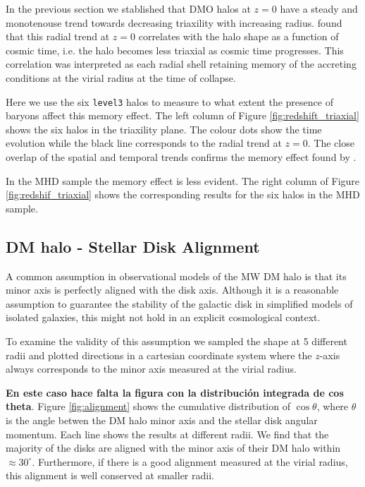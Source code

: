 \documentclass[a4paper,fleqn,usenatbib]{mnras}
\begin{document}
In the previous section we stablished that DMO halos at $z=0$ have
a steady and monotenouse trend towards decreasing triaxility with
increasing radius.
\cite{Vera-Ciro_et_al._2011} found that this  radial trend at $z=0$ 
correlates with the halo shape as a function of cosmic time, i.e.
the halo becomes less triaxial as cosmic time progresses. 
This correlation was interpreted as each radial shell retaining memory
of the accreting conditions at the virial radius at the time of
collapse.

Here we use the six \texttt{level3} halos to measure to what extent
the presence of baryons affect this memory effect.
The left column of Figure \ref{fig:redshift_triaxial} shows the six
halos in the triaxility plane. 
The colour dots show the time evolution while the black line
corresponds to the radial trend at $z=0$.
The close overlap of the spatial and temporal trends confirms the
memory effect found by \cite{Vera-Ciro_et_al.2011}.


In the MHD sample the memory effect is less evident. 
The right column of Figure \ref{fig:redshif_triaxial} shows the
corresponding results for the six halos in the MHD sample.



\subsection{DM halo - Stellar Disk Alignment}


A common assumption in observational models of the MW DM halo is that
its minor axis is perfectly aligned with the disk axis.
Although it is a reasonable assumption to guarantee the
stability of the galactic disk in simplified models of isolated
galaxies, this might not hold in an explicit cosmological context.

To examine the validity of this assumption  we sampled the shape at 5
different radii and plotted  directions in a cartesian coordinate
system where the $z$-axis always corresponds to the minor axis
measured at the virial radius.

{\bf En este caso hace falta la figura con la distribuci\'on integrada de cos theta}.
Figure \ref{fig:alignment} shows the cumulative distribution of
$\cos\theta$, where $\theta$ is the angle betwen the DM halo minor
axis and the stellar disk angular momentum.  
Each line shows the results at different radii.
We find that the majority of the disks are aligned with the minor axis
of their DM halo within $\approx 30^{\circ}$. 
Furthermore, if there is a good alignment measured at the virial
radius, this alignment is well conserved at smaller radii.
\end{document}
